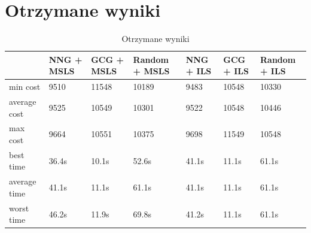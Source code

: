 \documentclass[a4paper 10pt]{article}
\begin{document}
\section{Otrzymane wyniki}
\begin{table}[H]
\centering
\caption{Otrzymane wyniki}
\label{my-label}
\begin{tabular}{|l|l|l|l|l|l|l|}
\hline
             & NNG + MSLS & GCG + MSLS & Random + MSLS & NNG + ILS & GCG + ILS & Random + ILS \\ \hline
min cost     & 9510 & 11548 & 10189 & 9483 & 10548 & 10330 \\ \hline
average cost & 9525 & 10549 & 10301 & 9522 & 10548 & 10446 \\ \hline
max cost     & 9664 & 10551 & 10375 & 9698 & 11549 & 10548 \\ \hline
best time    & 36.4s & 10.1s & 52.6s & 41.1s & 11.1s & 61.1s \\ \hline
average time & 41.1s & 11.1s & 61.1s & 41.1s & 11.1s & 61.1s \\ \hline
worst time   & 46.2s & 11.9s & 69.8s & 41.2s & 11.1s & 61.1s \\ \hline 
\end{tabular}
\end{table}
\end{document}
